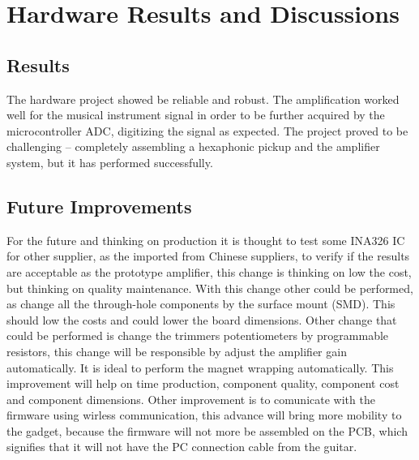 \section{Hardware Results and Discussions}

\subsection{Results}
The hardware project showed be reliable and robust. The amplification worked
well for the musical instrument signal in order to be further acquired by the
microcontroller ADC, digitizing the signal as expected.
The project proved to be challenging -- completely assembling a
hexaphonic pickup and the amplifier system, but it has performed successfully.

\subsection{Future Improvements}
For the future and thinking on production it is thought to test some INA326 IC
for other supplier, as the imported from Chinese suppliers, to verify if the results
are acceptable as the prototype amplifier, this change is thinking on low the cost,
but thinking on quality maintenance.
With this change other could be performed, as change all the through-hole components
by the surface mount (SMD). This should low the costs and could lower the board dimensions.
Other change that could be performed is change the trimmers potentiometers by programmable
resistors, this change will be responsible by adjust the amplifier gain automatically.
It is ideal to perform the magnet wrapping automatically. This improvement will help on time
production, component quality, component cost and component dimensions.
Other improvement is to comunicate with the firmware using wirless communication,
this advance will bring more mobility to the gadget, because the firmware will not more be
assembled on the PCB, which signifies that it will not have the PC connection cable from the guitar.
